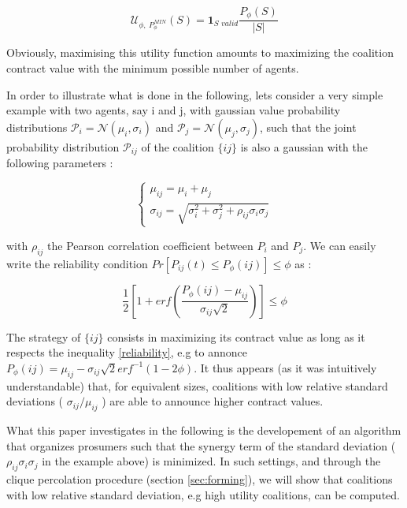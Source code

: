 \documentclass[conference]{IEEEtran}
\begin{document}
\begin{equation}
 \mathcal{U}_{\phi,\ P_{\phi}^{MIN}}(S) = \mathbf{1}_{\textit{S\ valid}} \dfrac{P_{\phi}(S)}{|S|} 
\label{utility}
\end{equation}

Obviously, maximising this utility function amounts to maximizing the coalition contract value with the minimum possible number of agents. 

In order to illustrate what is done in the following, lets consider a very simple example with two agents, say i and j, with gaussian value probability distributions $ \mathcal{P}_{i} = \mathcal{N}(\mu_{i}, \sigma_{i}) $ and $ \mathcal{P}_{j} = \mathcal{N}(\mu_{j}, \sigma_{j}) $, such that the joint probability distribution  $ \mathcal{P}_{ij} $ of the coalition $\{ij\}$ is also a gaussian with the following parameters :

\begin{equation}
\left\{ \begin{array}{lll}
		\mu_{ij} = \mu_{i} + \mu_{j} \\
		\sigma_{ij} = \sqrt{\sigma_{i}^{2} + \sigma_{j}^{2} + \rho_{ij}\sigma_{i}\sigma_{j}}
\end{array} \right.
\label{parameters}
\end{equation}

with $ \rho_{ij} $ the Pearson correlation coefficient between $ P_{i} $ and $ P_{j} $. We can easily write the reliability condition $ Pr[P_{ij}(t) \leq P_{\phi}(ij) ] \leq \phi $ as :

\begin{equation}
\dfrac{1}{2} \left[ 1+ erf \left( \dfrac{P_{\phi}(ij) - \mu_{ij}}{\sigma_{ij}\sqrt{2}} \right) \right] \leq \phi
\label{reliability}
\end{equation}

The strategy of $ \{ij\} $ consists in maximizing its contract value as long as it respects the inequality \ref{reliability}, e.g to annonce $ P_{\phi}(ij) = \mu_{ij} - \sigma_{ij}\sqrt{2}erf^{-1}(1-2 \phi ) $. It thus appears (as it was intuitively understandable) that, for equivalent sizes, coalitions with low relative standard deviations ( $ \sigma_{ij} / \mu_{ij} $ ) are able to announce higher contract values. 

What this paper investigates in the following is the developement of an algorithm that organizes prosumers such that the synergy term of the standard deviation ( $ \rho_{ij}\sigma_{i}\sigma_{j} $ in the example above) is minimized. In such settings, and through the clique percolation procedure (section \ref{sec:forming}), we will show that coalitions with low relative standard deviation, e.g high utility coalitions, can be computed.
\end{document}

